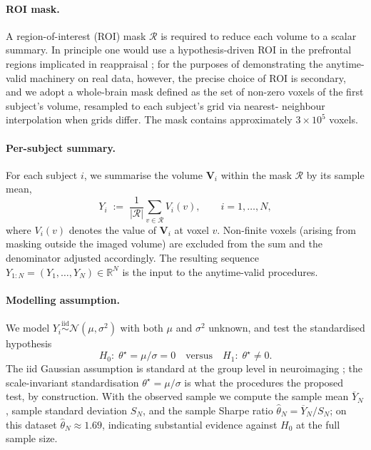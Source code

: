 \documentclass{article}%
\newcommand{\1}{\mathbf{1}}
\begin{document}
\paragraph{ROI mask.}
A region-of-interest (ROI) mask $\mathcal{R}$ is required to reduce each volume to a scalar summary. In principle one would use a hypothesis-driven ROI in the prefrontal regions implicated in reappraisal \citep{buhle2014cognitive}; for the purposes of demonstrating the anytime-valid
machinery on real data, however, the precise choice of ROI is secondary, and we adopt a whole-brain mask defined as the set of non-zero voxels of the first subject's volume, resampled to each subject's grid via nearest-
neighbour interpolation when grids differ. The mask contains approximately
$3 \times 10^5$ voxels.

\paragraph{Per-subject summary.}
For each subject $i$, we summarise the volume $\mathbf{V}_i$ within the
mask $\mathcal{R}$ by its sample mean,
\begin{equation}
\label{eq:y_obs_def}
  Y_i \;:=\; \frac{1}{|\mathcal{R}|}\sum_{v \in \mathcal{R}} V_i(v),
  \qquad i = 1, \ldots, N,
\end{equation}
where $V_i(v)$ denotes the value of $\mathbf{V}_i$ at voxel $v$. Non-finite
voxels (arising from masking outside the imaged volume) are excluded from
the sum and the denominator adjusted accordingly. The resulting sequence
$Y_{1:N} = (Y_1, \ldots, Y_N) \in \mathbb{R}^N$ is the input to the
anytime-valid procedures.

\paragraph{Modelling assumption.}
We model $Y_i \stackrel{\mathrm{iid}}{\sim} \mathcal{N}(\mu, \sigma^2)$
with both $\mu$ and $\sigma^2$ unknown, and test the standardised
hypothesis
\[
  H_0:\; \theta^\star = \mu/\sigma = 0
  \quad\text{versus}\quad
  H_1:\; \theta^\star \neq 0.
\]
The iid Gaussian assumption is standard at the group level in neuroimaging
\cite{penny2012comparing}; the scale-invariant standardisation $\theta^\star =
\mu/\sigma$ is what the procedures the proposed test, by construction. With the observed sample we compute the sample mean $\overline{Y}_N$, sample standard deviation $S_N$, and the sample Sharpe ratio $\widehat\theta_N = \overline{Y}_N / S_N$; on this dataset $\widehat\theta_N \approx 1.69$, indicating substantial evidence against $H_0$ at the full sample size.
\end{document}
